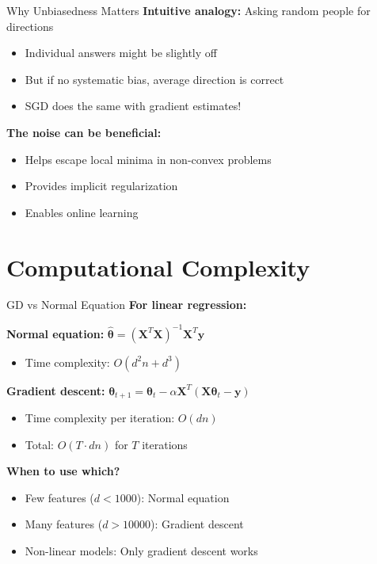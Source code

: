 \documentclass[aspectratio=169,11pt]{beamer}
\newcommand{\vtheta}{\bm{\theta}}
\newcommand{\vy}{\bm{y}}
\newcommand{\mX}{\bm{X}}
\begin{document}
\begin{frame}{Why Unbiasedness Matters}
\textbf{Intuitive analogy:} Asking random people for directions
\begin{itemize}
\item Individual answers might be slightly off
\item But if no systematic bias, average direction is correct
\item SGD does the same with gradient estimates!
\end{itemize}

\pause
\textbf{The noise can be beneficial:}
\begin{itemize}
\item Helps escape local minima in non-convex problems
\item Provides implicit regularization
\item Enables online learning
\end{itemize}
\end{frame}

\section{Computational Complexity}

\begin{frame}{GD vs Normal Equation}
\textbf{For linear regression:}

\textbf{Normal equation:} $\hat{\vtheta} = (\mX^T\mX)^{-1}\mX^T\vy$
\begin{itemize}
\item Time complexity: $O(d^2n + d^3)$
\end{itemize}

\pause
\textbf{Gradient descent:} $\vtheta_{t+1} = \vtheta_t - \alpha \mX^T(\mX\vtheta_t - \vy)$
\begin{itemize}
\item Time complexity per iteration: $O(dn)$
\item Total: $O(T \cdot dn)$ for $T$ iterations
\end{itemize}

\pause
\textbf{When to use which?}
\begin{itemize}
\item Few features ($d < 1000$): Normal equation
\item Many features ($d > 10000$): Gradient descent
\item Non-linear models: Only gradient descent works
\end{itemize}
\end{frame}
\end{document}

